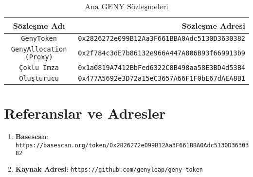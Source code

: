 \documentclass[a4paper,12pt,openany]{book}
\begin{document}
\begin{table}[h]
\centering
\caption*{Ana GENY Sözleşmeleri}
\small
\begin{tabular}{c r}
\hline
\textbf{Sözleşme Adı} & \textbf{Sözleşme Adresi} \\
\hline
\texttt{GenyToken} & {\texttt{0x2826272e099B12Aa3F661BBA0Adc5130D3630382}} \\
\texttt{GenyAllocation (Proxy)} & {\texttt{0x2f784c3dE7b86132e966A447A806B93f669913b9}} \\
\texttt{Çoklu İmza} & {\texttt{0x1a0819A7412BbFed6322C8B498aa58E3BD4d53B4}} \\
\texttt{Oluşturucu} & {\texttt{0x477A5692e3D72a15eC3657A66F1F0bE67dAEA8B1}} \\
\hline
\end{tabular}
\end{table}

\section*{Referanslar ve Adresler}

\begin{enumerate}
    \item \textbf{Basescan}: \texttt{https://basescan.org/token/0x2826272e099B12Aa3F661BBA0Adc5130D3630382}
    \item \textbf{Kaynak Adresi}: \texttt{https://github.com/genyleap/geny-token}
\end{enumerate}
\end{document}
